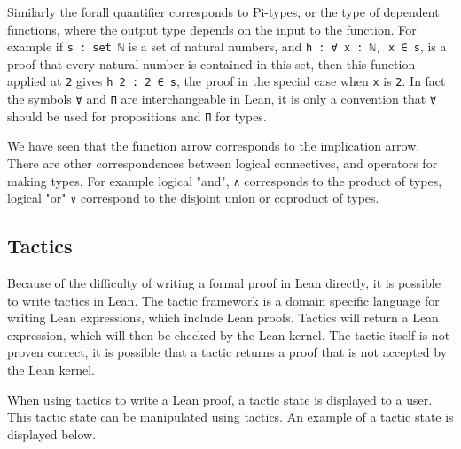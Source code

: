 \documentclass[11pt]{article} %
\theoremstyle{definition}
\theoremstyle{definition}
\theoremstyle{definition}
\theoremstyle{definition}
\theoremstyle{definition}
\theoremstyle{definition}
\begin{document}
Similarly the forall quantifier corresponds to Pi-types, or the type of dependent functions,
where the output type depends on the input to the function.
For example if \lstinline{s : set ℕ} is a set of natural numbers,
and \lstinline{h : ∀ x : ℕ, x ∈ s}, is a proof that every natural number is contained
in this set, then this function applied at \lstinline{2} gives \lstinline{h 2 : 2 ∈ s},
the proof in the special case when \lstinline{x} is \lstinline{2}. In fact the
symbols \lstinline{∀} and \lstinline{Π} are interchangeable in Lean, it is only a
convention that \lstinline{∀} should be used for propositions and \lstinline{Π} for types.

We have seen that the function arrow corresponds to the implication arrow. There
are other correspondences between logical connectives, and operators for making types.
For example logical "and", \lstinline{∧} corresponds to the product of types,
logical "or" \lstinline{∨} correspond to the disjoint union or coproduct of types.

\subsection{Tactics}

Because of the difficulty of writing a formal proof in Lean directly, it is possible
to write tactics in Lean. The tactic framework is a domain specific language for writing
Lean expressions, which include Lean proofs. Tactics will return a Lean expression,
which will then be checked by the Lean kernel. The tactic itself is not proven correct,
it is possible that a tactic returns a proof that is not accepted by the Lean kernel.

When using tactics to write a Lean proof, a tactic state is displayed to a user.
This tactic state can be manipulated using tactics. An example of a tactic state is displayed
below.
\end{document}
